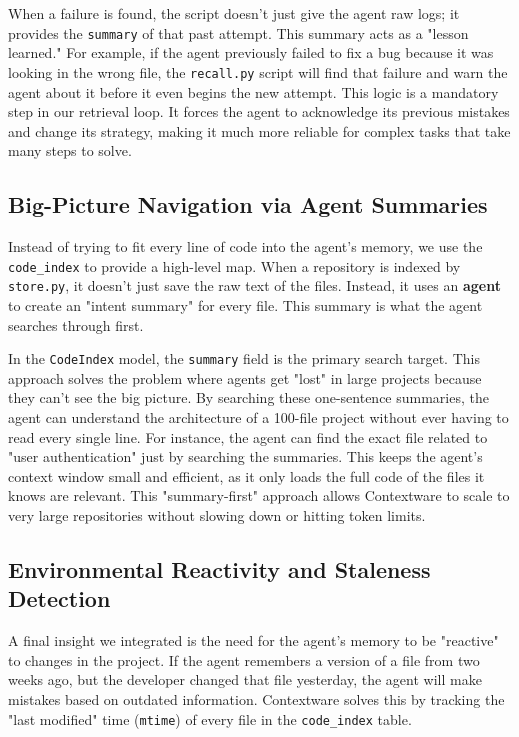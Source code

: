 \documentclass[conference]{IEEEtran}
\begin{document}
When a failure is found, the script doesn't just give the agent raw logs; it provides the \texttt{summary} of that past attempt. This summary acts as a "lesson learned." For example, if the agent previously failed to fix a bug because it was looking in the wrong file, the \texttt{recall.py} script will find that failure and warn the agent about it before it even begins the new attempt. This logic is a mandatory step in our retrieval loop. It forces the agent to acknowledge its previous mistakes and change its strategy, making it much more reliable for complex tasks that take many steps to solve.

\subsection{Big-Picture Navigation via Agent Summaries}
Instead of trying to fit every line of code into the agent's memory, we use the \texttt{code\_index} to provide a high-level map. When a repository is indexed by \texttt{store.py}, it doesn't just save the raw text of the files. Instead, it uses an \textbf{agent} to create an "intent summary" for every file. This summary is what the agent searches through first.

In the \texttt{CodeIndex} model, the \texttt{summary} field is the primary search target. This approach solves the problem where agents get "lost" in large projects because they can't see the big picture. By searching these one-sentence summaries, the agent can understand the architecture of a 100-file project without ever having to read every single line. For instance, the agent can find the exact file related to "user authentication" just by searching the summaries. This keeps the agent's context window small and efficient, as it only loads the full code of the files it knows are relevant. This "summary-first" approach allows Contextware to scale to very large repositories without slowing down or hitting token limits.

\subsection{Environmental Reactivity and Staleness Detection}
A final insight we integrated is the need for the agent's memory to be "reactive" to changes in the project. If the agent remembers a version of a file from two weeks ago, but the developer changed that file yesterday, the agent will make mistakes based on outdated information. Contextware solves this by tracking the "last modified" time (\texttt{mtime}) of every file in the \texttt{code\_index} table.
\end{document}
